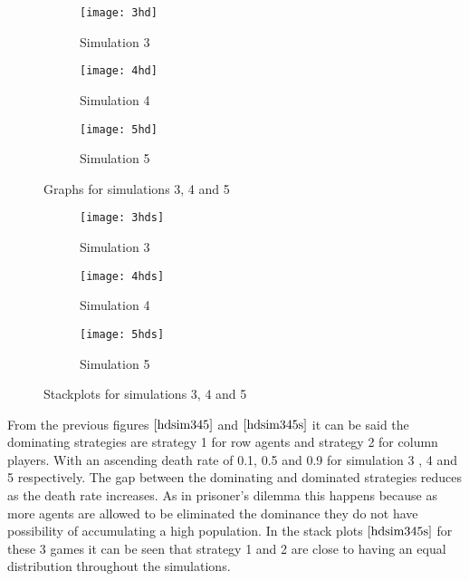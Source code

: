 \begin{figure}[H]       
    \centering
    \begin{subfigure}[b]{0.3\textwidth}
	\centering
	{\texttt{[image: 3hd]}}   
    	\caption{Simulation 3}
	\label{fig:hd3}
    \end{subfigure}
    \hfill
    \begin{subfigure}[b]{0.3\textwidth}
	\centering
	{\texttt{[image: 4hd]}}   
    	\caption{Simulation 4}
	\label{fig:hd4}
    \end{subfigure}
    \hfill
    \begin{subfigure}[b]{0.3\textwidth}
	\centering
	{\texttt{[image: 5hd]}}   
    	\caption{Simulation 5}
	\label{fig:hd5}
    \end{subfigure}
    \caption{Graphs for simulations 3, 4 and 5}
    \label{hdsim345}
\end{figure}
\begin{figure}[H]       
    \centering
    \begin{subfigure}[b]{0.3\textwidth}
	\centering
	{\texttt{[image: 3hds]}}   
    	\caption{Simulation 3}
	\label{fig:hd3s}
    \end{subfigure}
    \hfill
    \begin{subfigure}[b]{0.3\textwidth}
	\centering
	{\texttt{[image: 4hds]}}   
    	\caption{Simulation 4}
	\label{fig:hd4s}
    \end{subfigure}
    \hfill
    \begin{subfigure}[b]{0.3\textwidth}
	\centering
	{\texttt{[image: 5hds]}}   
    	\caption{Simulation 5}
	\label{fig:hd5s}
    \end{subfigure}
    \caption{Stackplots for simulations 3, 4 and 5}
    \label{hdsim345s}
\end{figure}

From the previous figures $\ref{hdsim345}$ and $\ref{hdsim345s}$  it can be said the dominating strategies are strategy 1 for row agents and strategy 2 for column players. With an ascending death rate of 0.1, 0.5 and 0.9 for simulation 3 , 4 and 5 respectively. The gap between the dominating and dominated strategies reduces as the death rate increases. As in prisoner's dilemma this happens because as more agents are allowed to be eliminated the dominance they do not have possibility of accumulating a high population. In the stack plots $\ref{hdsim345s}$ for these 3 games it can be seen that strategy 1 and 2 are close to having an equal distribution throughout the simulations. 


